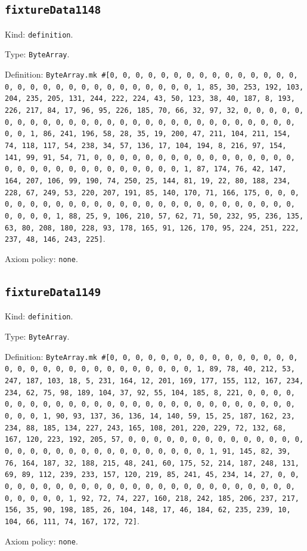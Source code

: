 \documentclass[11pt]{article}
\begin{document}
\subsection*{\texttt{fixtureData1148}}
\noindent Kind: \texttt{definition}.\par
\noindent Type: \texttt{ByteArray}.\par
\noindent Definition: \texttt{ByteArray.mk \#[0, 0, 0, 0, 0, 0, 0, 0, 0, 0, 0, 0, 0, 0, 0, 0, 0, 0, 0, 0, 0, 0, 0, 0, 0, 0, 0, 0, 0, 0, 1, 85, 30, 253, 192, 103, 204, 235, 205, 131, 244, 222, 224, 43, 50, 123, 38, 40, 187, 8, 193, 226, 217, 84, 17, 96, 95, 226, 185, 70, 66, 32, 97, 32, 0, 0, 0, 0, 0, 0, 0, 0, 0, 0, 0, 0, 0, 0, 0, 0, 0, 0, 0, 0, 0, 0, 0, 0, 0, 0, 0, 0, 0, 0, 1, 86, 241, 196, 58, 28, 35, 19, 200, 47, 211, 104, 211, 154, 74, 118, 117, 54, 238, 34, 57, 136, 17, 104, 194, 8, 216, 97, 154, 141, 99, 91, 54, 71, 0, 0, 0, 0, 0, 0, 0, 0, 0, 0, 0, 0, 0, 0, 0, 0, 0, 0, 0, 0, 0, 0, 0, 0, 0, 0, 0, 0, 0, 0, 1, 87, 174, 76, 42, 147, 164, 207, 106, 99, 190, 74, 250, 25, 144, 81, 19, 22, 80, 188, 234, 228, 67, 249, 53, 220, 207, 191, 85, 140, 170, 71, 166, 175, 0, 0, 0, 0, 0, 0, 0, 0, 0, 0, 0, 0, 0, 0, 0, 0, 0, 0, 0, 0, 0, 0, 0, 0, 0, 0, 0, 0, 0, 0, 1, 88, 25, 9, 106, 210, 57, 62, 71, 50, 232, 95, 236, 135, 63, 80, 208, 180, 228, 93, 178, 165, 91, 126, 170, 95, 224, 251, 222, 237, 48, 146, 243, 225]}.\par
\noindent Axiom policy: \texttt{none}.\par
\subsection*{\texttt{fixtureData1149}}
\noindent Kind: \texttt{definition}.\par
\noindent Type: \texttt{ByteArray}.\par
\noindent Definition: \texttt{ByteArray.mk \#[0, 0, 0, 0, 0, 0, 0, 0, 0, 0, 0, 0, 0, 0, 0, 0, 0, 0, 0, 0, 0, 0, 0, 0, 0, 0, 0, 0, 0, 0, 1, 89, 78, 40, 212, 53, 247, 187, 103, 18, 5, 231, 164, 12, 201, 169, 177, 155, 112, 167, 234, 234, 62, 75, 98, 189, 104, 37, 92, 55, 104, 185, 8, 221, 0, 0, 0, 0, 0, 0, 0, 0, 0, 0, 0, 0, 0, 0, 0, 0, 0, 0, 0, 0, 0, 0, 0, 0, 0, 0, 0, 0, 0, 0, 1, 90, 93, 137, 36, 136, 14, 140, 59, 15, 25, 187, 162, 23, 234, 88, 185, 134, 227, 243, 165, 108, 201, 220, 229, 72, 132, 68, 167, 120, 223, 192, 205, 57, 0, 0, 0, 0, 0, 0, 0, 0, 0, 0, 0, 0, 0, 0, 0, 0, 0, 0, 0, 0, 0, 0, 0, 0, 0, 0, 0, 0, 0, 0, 1, 91, 145, 82, 39, 76, 164, 187, 32, 188, 215, 48, 241, 60, 175, 52, 214, 187, 248, 131, 69, 89, 112, 239, 233, 157, 120, 219, 85, 241, 45, 234, 14, 27, 0, 0, 0, 0, 0, 0, 0, 0, 0, 0, 0, 0, 0, 0, 0, 0, 0, 0, 0, 0, 0, 0, 0, 0, 0, 0, 0, 0, 0, 0, 1, 92, 72, 74, 227, 160, 218, 242, 185, 206, 237, 217, 156, 35, 90, 198, 185, 26, 104, 148, 17, 46, 184, 62, 235, 239, 10, 104, 66, 111, 74, 167, 172, 72]}.\par
\noindent Axiom policy: \texttt{none}.\par
\end{document}
